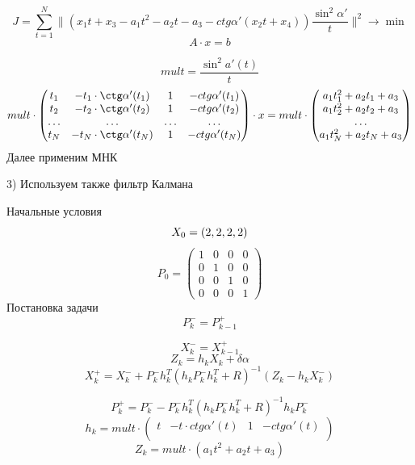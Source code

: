 \documentclass[a4paper,14pt]{article}
\theoremstyle{plain} %
\theoremstyle{definition} %
\theoremstyle{remark} %
\begin{document}
\[ J=\sum_{t=1}^{N} \lVert( x_1t+x_3-a_1t^2-a_2t-a_3-ctg\alpha'( x_2t+x_4))\frac{\sin^2\alpha'}{t} \rVert^2 \rightarrow \min \]
\[
A\cdot x=b
\]

\[
mult=\frac{\sin^2a'(t)}{t}
\]
\[
    mult\cdot
\begin{pmatrix}
    t_1 & -t_1\cdot \ctg \alpha'(t_1)  & 1 & -ctg \alpha'(t_1) \\
    t_2 & -t_2\cdot \ctg \alpha'(t_2)  & 1 & -ctg \alpha'(t_2) \\
    \dots & \dots & \dots & \dots \\
    t_N & -t_N\cdot \ctg \alpha'(t_N)  & 1 & -ctg \alpha'(t_N)
\end{pmatrix}
\cdot x =    mult\cdot
\begin{pmatrix}
    a_1t_1^2+a_2t_1+a_3 \\
    a_1t_2^2+a_2t_2+a_3 \\
    \dots  \\
    a_1t_N^2+a_2t_N+a_3 \\
\end{pmatrix}
\]
Далее применим МНК

3) Используем также фильтр Калмана

Начальные условия
$$
X_0=(2,2,2,2)\\
$$
$$
P_0=\begin{pmatrix}
    1 & 0 & 0 & 0  \\
    0 & 1  & 0 & 0 \\
    0 & 0 & 1 & 0 \\
    0 & 0  & 0 & 1
\end{pmatrix}
$$
Постановка задачи
$$
P_k^-=P_{k-1}^+
$$

$$
X_k^-=X_{k-1}^+
$$
$$
Z_k=h_kX_k+\delta\alpha
$$
$$
X_k^+=X_k^-+P_k^-h_k^T(h_kP_k^-h_k^T+R)^{-1}(Z_k-h_kX_k^-)
$$

$$
P_k^+=P_k^--P_k^-h_k^T(h_kP_k^-h_k^T+R)^{-1}h_kP_k^-
$$
$$
h_k=mult \cdot\begin{pmatrix}
    t & -t\cdot ctg \alpha'(t) & 1 & -ctg \alpha'(t)  \\
\end{pmatrix}
$$
$$
Z_k=mult\cdot (a_1t^2+a_2t+a_3)
$$
\end{document}
